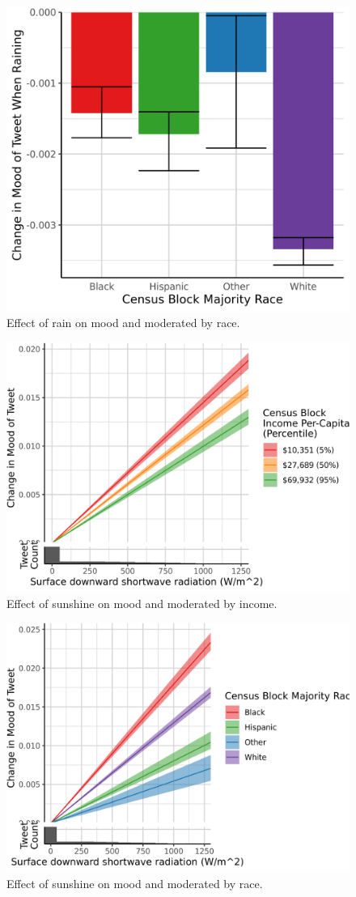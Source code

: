 \documentclass[9pt,twoside,lineno]{pnas-new}
\begin{document}
\begin{figure}[H]
  \centering
  \includegraphics[width=0.6\linewidth]{../../../res/raining-race_q.png}
  \caption{Effect of rain on mood and moderated by race.}
  \label{fig:timeseries}
\end{figure}


\begin{figure}[H]
  \centering
  \includegraphics[width=0.6\linewidth]{../../../res/srad-income.png}
  \caption{Effect of sunshine on mood and moderated by income.}
  \label{fig:timeseries}
\end{figure}

\begin{figure}[H]
  \centering
  \includegraphics[width=0.6\linewidth]{../../../res/srad-race_q.png}
  \caption{Effect of sunshine on mood and moderated by race.}
  \label{fig:timeseries}
\end{figure}
\end{document}
